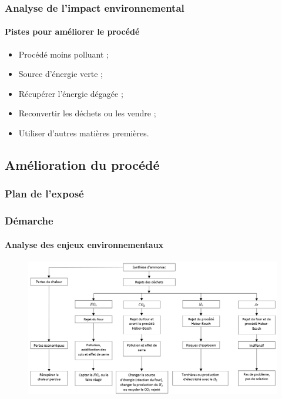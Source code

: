 \documentclass{beamer}
\begin{document}
	\begin{frame}
	\frametitle{Analyse de l'impact environnemental}
	\framesubtitle{Pistes pour améliorer le procédé}
	\begin{itemize}
		\item Procédé moins polluant ;
		\item Source d'énergie verte ;
		\item Récupérer l'énergie dégagée ;
		\item Reconvertir les déchets ou les vendre ;
		\item Utiliser d'autres matières premières.
	\end{itemize}
	\end{frame}
	
	\begin{frame}
		\section{Amélioration du procédé}
		\frametitle{Plan de l'exposé}
		\tableofcontents[currentsubsection,sectionstyle=show/shaded,subsectionstyle=show/shaded/hide]
	\end{frame}
	
	\begin{frame}
		\frametitle{Démarche}
		\framesubtitle{Analyse des enjeux environnementaux}
		\begin{figure}
			\centering
			\includegraphics[scale=0.40]{media/mindmap.png}
		\end{figure}
	\end{frame}
	
\end{document}
